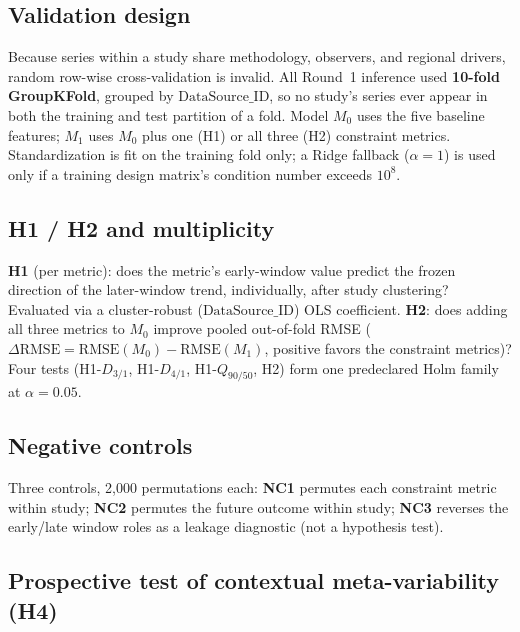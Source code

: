 \documentclass[11pt]{article}
\newcommand{\Dthreeone}{D_{3/1}}
\newcommand{\Dfourone}{D_{4/1}}
\newcommand{\Qninefifty}{Q_{90/50}}
\newcommand{\dRMSE}{\Delta\mathrm{RMSE}}
\begin{document}
\subsection{Validation design}

Because series within a study share methodology, observers, and regional
drivers, random row-wise cross-validation is invalid. All Round~1
inference used \textbf{10-fold GroupKFold}, grouped by
$\mathrm{DataSource\_ID}$, so no study's series ever appear in both the
training and test partition of a fold. Model $M_0$ uses the five baseline
features; $M_1$ uses $M_0$ plus one (H1) or all three (H2) constraint
metrics. Standardization is fit on the training fold only; a Ridge
fallback ($\alpha=1$) is used only if a training design matrix's
condition number exceeds $10^8$.

\subsection{H1 / H2 and multiplicity}

\textbf{H1} (per metric): does the metric's early-window value predict
the frozen direction of the later-window trend, individually, after study
clustering? Evaluated via a cluster-robust ($\mathrm{DataSource\_ID}$)
OLS coefficient. \textbf{H2}: does adding all three metrics to $M_0$
improve pooled out-of-fold RMSE ($\dRMSE = \mathrm{RMSE}(M_0)-
\mathrm{RMSE}(M_1)$, positive favors the constraint metrics)? Four tests
(H1-$\Dthreeone$, H1-$\Dfourone$, H1-$\Qninefifty$, H2) form one
predeclared Holm family at $\alpha=0.05$.

\subsection{Negative controls}

Three controls, 2{,}000 permutations each: \textbf{NC1} permutes each
constraint metric within study; \textbf{NC2} permutes the future outcome
within study; \textbf{NC3} reverses the early/late window roles as a
leakage diagnostic (not a hypothesis test).

\subsection{Prospective test of contextual meta-variability (H4)}
\end{document}
